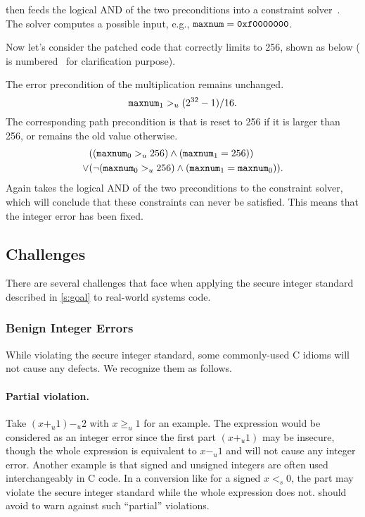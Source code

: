 \sys then feeds the logical AND of the two preconditions into a
constraint solver~\cite{boolector}.  The solver computes a possible
input, e.g., $\texttt{maxnum} = \texttt{0xf0000000}$.

Now let's consider the patched code that correctly limits 
to 256, shown as below ( is
numbered~\cite[\chapterautorefname~8.11]{whale} for clarification
purpose).

The error precondition of the multiplication remains unchanged.
\begin{equation*}
\texttt{maxnum}_1 >_u (2^{32} - 1) / 16.
\end{equation*}
The corresponding path precondition is that  is reset to 256
if it is larger than 256, or remains the old value otherwise.
\begin{align*}
& ((\texttt{maxnum}_0 >_u 256) \land (\texttt{maxnum}_1 = 256)) \\
\lor
& (\neg (\texttt{maxnum}_0 >_u 256) \land (\texttt{maxnum}_1 = \texttt{maxnum}_0)).
\end{align*}
Again \sys takes the logical AND of the two preconditions to the
constraint solver, which will conclude that these constraints can
never be satisfied.  This means that the integer error has been
fixed.

\subsection{Challenges}
\label{s:chal}

There are several challenges that face \sys when applying the
secure integer standard described in \autoref{s:goal} to real-world
systems code.

\subsubsection{Benign Integer Errors}

While violating the secure integer standard, some commonly-used C
idioms will not cause any defects.  We recognize them as follows.

\paragraph{Partial violation.}
Take $(x +_u 1) -_u 2$ with $x \geq_u 1$ for an example.  The
expression would be considered as an integer error since the first
part $(x +_u 1)$ may be insecure, though the whole expression is
equivalent to $x -_u 1$ and will not cause any integer error.
Another example is that signed and unsigned integers are often used
interchangeably in C code.  In a conversion like 
for a signed $x <_s 0$, the part  may violate the
secure integer standard while the whole expression does not.  \sys
should avoid to warn against such ``partial'' violations.

